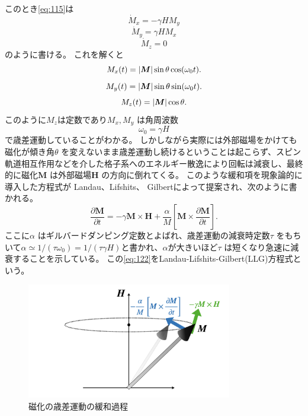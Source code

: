 \documentclass[dvipdfmx,11pt]{jsreport}
\numberwithin{equation}{chapter}
\numberwithin{table}{chapter}
\begin{document}
このとき\eqref{eq:115}は
\begin{equation}
\label{eq:116}
	\dot{M}_x=-\gamma H M_y
\end{equation}
\begin{equation}
\label{eq:117}
	\dot{M}_y=\gamma H M_x
\end{equation}
\begin{equation}
\label{eq:118}
	\dot{M}_z=0
\end{equation}
のように書ける。
これを解くと
\begin{equation}
\label{eq:119}
	M_x(t)=\abs{\bm{M}}\sin \theta \cos (\omega_0 t)
.\end{equation}
\begin{equation}
\label{eq:119-2}
	M_y(t)=\abs{\bm{M}}\sin \theta \sin  (\omega_0 t)
.\end{equation}
\begin{equation}
\label{eq:120}
	M_z(t)=\abs{\bm{M}}\cos \theta
.\end{equation}
このように$M_z$は定数であり$M_x,M_y$ は角周波数
\begin{equation}
\label{eq:121}
	\omega_0=\gamma H
\end{equation}
で歳差運動していることがわかる。
しかしながら実際には外部磁場をかけても磁化が傾き角$\theta$ を変えないまま歳差運動し続けるということは起こらず、スピン軌道相互作用などを介した格子系へのエネルギー散逸により回転は減衰し、最終的に磁化$\bm{M}$ は外部磁場$\bm{H}$ の方向に倒れてくる。
このような緩和項を現象論的に導入した方程式が Landau、Lifshits、 Gilbertによって提案され、次のように書かれる。
\begin{equation}
\label{eq:122}
	\frac{\partial \bm{M}}{\partial t} =-\gamma \bm{M}\times \bm{H}+\frac{\alpha}{M}\left[ \bm{M}\times \frac{\partial \bm{M}}{\partial t}  \right] 
.\end{equation}
ここに$\alpha$ はギルバードダンピング定数とよばれ、歳差運動の減衰時定数$\tau$ をもちいて$\alpha\simeq 1 /(\tau\omega_0)=1 /(\tau\gamma H)$\cite{alma9926360528104034}と書かれ、$\alpha$が大きいほど$\tau$ は短くなり急速に減衰することを示している。
この\eqref{eq:122}をLandau-Lifshits-Gilbert(LLG)方程式という。

\begin{figure}[H]
	\centering
	\includegraphics[width=0.8\textwidth]{fig/fig.008.jpeg}
	\caption{磁化の歳差運動の緩和過程}
	\label{fig:fig-fig-008-jpeg}
\end{figure}
\end{document}
